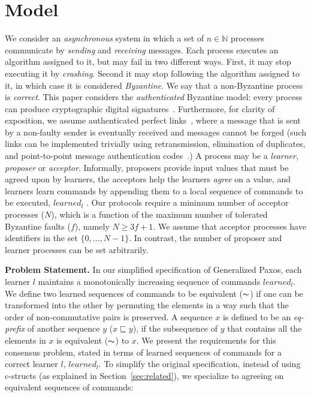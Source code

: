 \section{Model}
\label{sec:model}
%
We consider an \emph{asynchronous} system in which
a set of $n \in \mathbb{N}$ processes communicate by 
\emph{sending} and \emph{receiving} messages.
Each process executes an algorithm assigned to it, but may fail in two different ways. First, it may stop executing it by \emph{crashing}.
Second it may stop following the algorithm assigned to it, in which case it is considered \emph{Byzantine}. We say that a non-Byzantine process is \emph{correct}.
This paper considers the \emph{authenticated} Byzantine model: every process can produce cryptographic digital signatures~\cite{quorum}. 
Furthermore, for clarity of exposition, we assume authenticated perfect links~\cite{cgr:book}, 
where a message that is sent by a non-faulty sender is eventually received and messages cannot be forged 
(such links can be implemented trivially using retransmission, elimination of duplicates, and point-to-point message authentication codes~\cite{cgr:book}.)
A process may be a \emph{learner}, \emph{proposer} or \emph{acceptor}.
Informally, proposers provide input values that must be agreed upon by learners, the acceptors help the learners \emph{agree} on a value, and learners learn commands by appending them to a local sequence of commands to be executed, $learned_l$ .
Our protocols require a minimum number of acceptor processes ($N$), which is a function of the maximum number of tolerated Byzantine faults ($f$), namely $N \ge 3f+1$. We assume that acceptor processes have identifiers in the set $\{0,...,N-1\}$. In contrast, the number of proposer and learner processes can be set arbitrarily.\par
\noindent\textbf{Problem Statement.}
In our simplified specification of Generalized Paxos, each learner $l$ maintains a monotonically increasing sequence of commands $learned_l$. 
We define two learned sequences of commands to be equivalent ($\thicksim$) 
if one can be transformed into the other by permuting the elements in a way such that the order of non-commutative pairs is preserved. A sequence $x$ is defined to be an \textit{eq-prefix} of another sequence $y$ ($x \sqsubseteq y$), if the subsequence of $y$ that contains all the elements in $x$ is equivalent ($\thicksim$) to $x$. 
We present the requirements for this consensus problem, stated in terms of learned sequences of commands for a correct learner $l$, $learned_l$. 
To simplify the original specification, instead of using c-structs (as explained in Section~\ref{sec:related}), we specialize to agreeing on equivalent sequences of commands:\par
